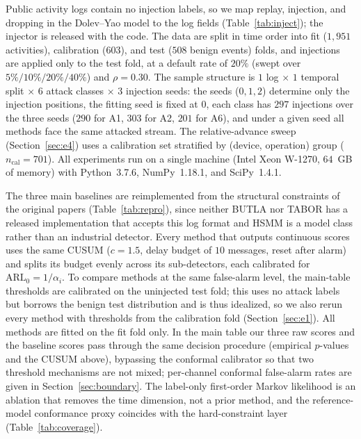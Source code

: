 \documentclass[manuscript,screen,review]{acmart}
\begin{document}
Public activity logs contain no injection labels, so we map replay, injection, and dropping in the {Dolev--Yao} model to the log fields (Table~\ref{tab:inject}); the injector is released with the code. The data are split in time order into fit ($1{,}951$ activities), calibration ($603$), and test ($508$ benign events) folds, and injections are applied only to the test fold, at a default rate of $20\%$ (swept over $5\%/10\%/20\%/40\%$) and $\rho=0.30$. The sample structure is $1$ log $\times$ $1$ temporal split $\times$ $6$ attack classes $\times$ $3$ injection seeds: the seeds ($0,1,2$) determine only the injection positions, the fitting seed is fixed at $0$, each class has $297$ injections over the three seeds ($290$ for {A1}, $303$ for {A2}, $201$ for {A6}), and under a given seed all methods face the same attacked stream. The relative-advance sweep (Section~\ref{sec:e4}) uses a calibration set stratified by (device, operation) group ($n_{\mathrm{cal}}=701$). All experiments run on a single machine ({Intel Xeon W-1270}, $64$~GB of memory) with {Python}~3.7.6, {NumPy}~1.18.1, and {SciPy}~1.4.1.

The three main baselines are reimplemented from the structural constraints of the original papers (Table~\ref{tab:repro}), since neither {BUTLA} nor {TABOR} has a released implementation that accepts this log format and {HSMM} is a model class rather than an industrial detector. Every method that outputs continuous scores uses the same {CUSUM} ($c=1.5$, delay budget of $10$ messages, reset after alarm) and splits its budget evenly across its sub-detectors, each calibrated for $\mathrm{ARL}_0=1/\alpha_i$. To compare methods at the same false-alarm level, the main-table thresholds are calibrated on the uninjected test fold; this uses no attack labels but borrows the benign test distribution and is thus idealized, so we also rerun every method with thresholds from the calibration fold (Section~\ref{sec:e1}). All methods are fitted on the fit fold only. In the main table our three raw scores and the baseline scores pass through the same decision procedure (empirical $p$-values and the {CUSUM} above), bypassing the conformal calibrator so that two threshold mechanisms are not mixed; per-channel conformal false-alarm rates are given in Section~\ref{sec:boundary}. The label-only first-order Markov likelihood is an ablation that removes the time dimension, not a prior method, and the reference-model conformance proxy coincides with the hard-constraint layer (Table~\ref{tab:coverage}).
\end{document}

